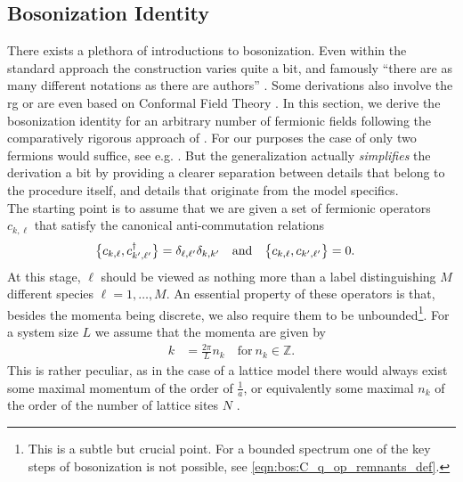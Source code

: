\subsection{Bosonization Identity}\label{sec:bos:bosonization_identity}
There exists a plethora of introductions to bosonization.
Even within the standard approach \cite{Giamarchi_2004,Gogolin_1999,Fradkin_2013,QMB_Fabrizio_2022,Bosonization_TLL_Schonhammer_1997,Bosonization_GF_LL_Meden_1999,Bosonization_Rao_2001,Bosonization_LowE_1d_fluids_Haldane_1981} the construction varies quite a bit, and famously ``there are as many different notations as there are authors'' \cite[]{Giamarchi_2004}.
Some derivations also involve the \acrlong{rg} \cite{Bosonization_Shankar_1994,Bosonization_Schulz_1995} or are even based on Conformal Field Theory \cite{Bosonization_Senechal_2004}.
In this section, we derive the bosonization identity for an arbitrary number of fermionic fields following the comparatively rigorous approach of \cite{Bosonization_DelftSchoeller_1998}.
For our purposes the case of only two fermions would suffice, see e.g. \cite{Giamarchi_2004}.
But the generalization actually \emph{simplifies} the derivation a bit by providing a clearer separation between details that belong to the procedure itself, and details that originate from the model specifics.\\
The starting point is to assume that we are given a set of fermionic operators $c_{k,\ell}$ that satisfy the canonical anti-commutation relations
\begin{align}
\klc[\big]{c_{k,\ell}, c_{k',\ell'}^\dagger} &= \delta_{\ell,\ell'} \delta_{k,k'}\quad\text{and}\quad \klc[\big]{c_{k,\ell}, c_{k',\ell'}} = 0. \label{eqn:bos:ckell_canonical_comm}
\end{align}
At this stage, $\ell$ should be viewed as nothing more than a label distinguishing $M$ different species $\ell=1,\dots,M$.
An essential property of these operators is that, besides the momenta being discrete, we also require them to be unbounded\footnote{This is a subtle but crucial point. For a bounded spectrum one of the key steps of bosonization is not possible, see \autoref{eqn:bos:C_q_op_remnants_def}.}.
For a system size $L$ we assume that the momenta are given by
\begin{align*}
k &= \frac{2\pi}{L} n_k\quad\text{for}\ n_k\in\mathbb{Z}.
\end{align*}
This is rather peculiar, as in the case of a lattice model there would always exist some maximal momentum of the order of $\frac{1}{a}$, or equivalently some maximal $n_k$ of the order of the number of lattice sites $N$ \cite[]{Bosonization_Rao_2001}.
